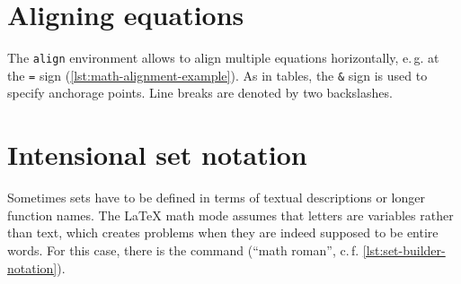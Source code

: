 
\section{Aligning equations}

The \texttt{align} environment allows to align multiple equations horizontally, e.\,g. at the \texttt{=} sign (\cref{lst:math-alignment-example}).
As in tables, the \texttt{\&} sign is used to specify anchorage points.
Line breaks are denoted by two backslashes.


\section{Intensional set notation}

Sometimes sets have to be defined in terms of textual descriptions or longer function names.
The \LaTeX{} math mode assumes that letters are variables rather than text, which creates problems when they are indeed supposed to be entire words.
For this case, there is the \texttt{\mathrm{}} command (\enquote{math roman}, c.\,f. \cref{lst:set-builder-notation}).

